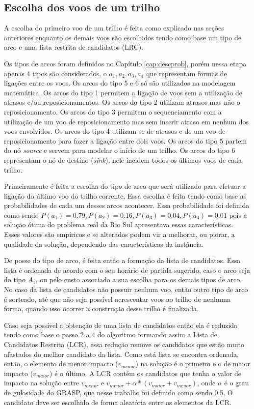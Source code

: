   
\subsection{Escolha dos voos de um trilho}

A escolha do primeiro voo de um trilho é feita como explicado nas seções
anteriores enquanto os demais voos são escolhidos tendo como base um tipo de
arco e uma lista restrita de candidatos (LRC).
 
Os tipos de arcos foram definidos no Capítulo \ref{cap:descprob}, porém nessa
etapa apenas 4 tipos são considerados, o   $a_{1},a_{2},a_{3},a_{4}$ que
representam formas de ligações entre os voos. Os arcos do tipo 5 e 6 só são
utilizados na modelagem matemática. Os arcos do tipo 1 permitem a
ligação de voos sem a utilização de atrasos e/ou reposicionamentos. Os arcos do
tipo 2 utilizam atrasos mas não o reposicionamento. Os arcos do tipo 3 permitem
o sequenciamento com a utilização de um voo de reposicionamento mas sem inserir
atraso em nenhum dos voos envolvidos. Os arcos do tipo 4 utilizam-se de atrasos
e de um voo de reposicionamento para fazer a ligação entre dois voos. Os arcos
do tipo 5 partem do nó \textit{source} e servem para modelar o início de um
trilho. Os arcos do tipo 6 representam o nó de destino (\textit{sink}), nele
incidem todos os últimos voos de cada trilho.

Primeiramente é feita a escolha do tipo de arco que será utilizado para efetuar
a ligação do último voo do trilho corrente. Essa escolha é feita tendo
como base as probabilidades de cada um desses arcos acontecer. Essa
probabilidade foi definida como sendo
$P(a_{1})=0.79,P(a_{2})=0.16,P(a_{3})=0.04,P(a_{4})=0.01$ pois a solução ótima
do problema real da Rio Sul apresentava essas características. Esses valores
são empíricos e se alterados podem vir a melhorar, ou piorar, a qualidade da
solução, dependendo das características da instância.

De posse do tipo de arco, é feita então a formação da lista de candidatos. Essa
lista é ordenada de acordo com o seu horário de partida sugerido, caso o arco
seja do tipo $A_{1}$, ou pelo custo associado a sua escolha para os demais
tipos de arco. No caso da lista de candidatos não possuir nenhum voo, então
outro tipo de arco é sorteado, até que não seja possível acrescentar voos ao
trilho de nenhuma forma, quando isso ocorrer a construção
desse trilho é finalizada.
 
Caso seja possível a obtenção de uma lista de candidatos então ela é reduzida
tendo como base o passo 2 a 4 do algoritmo  formando
assim a Lista de Candidatos Restrita (LCR), essa redução remove os candidatos
que estão muito afastados do melhor candidato da lista. Como está lista se
encontra ordenada, então, o elemento de menor impacto ($v_{menor}$) na solução é o
primeiro e o de maior impacto ($v_{maior}$) é o último. A LCR contém os
candidatos que tenha o valor de impacto na solução entre $v_{menor}$
e $v_{menor} + \alpha*(v_{maior} + v_{menor})$, onde $\alpha$ é o
grau de gulosidade do GRASP, que nesse trabalho foi definido como sendo 0.5. O
candidato deve ser escolhido de forma aleatória entre os elementos da LCR.

